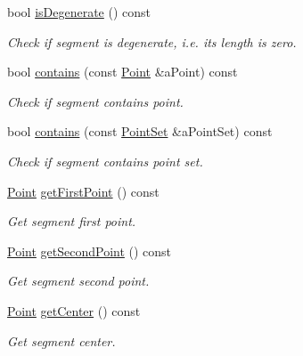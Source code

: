 \begin{DoxyCompactItemize}
bool \hyperlink{classostk_1_1math_1_1geom_1_1d2_1_1objects_1_1_segment_a35a46e06daf7d791b0069641cf684f91}{is\+Degenerate} () const
\begin{DoxyCompactList}\small\item\em Check if segment is degenerate, i.\+e. its length is zero. \end{DoxyCompactList}\item 
bool \hyperlink{classostk_1_1math_1_1geom_1_1d2_1_1objects_1_1_segment_a08468b912471a18d29062b96968afc2f}{contains} (const \hyperlink{classostk_1_1math_1_1geom_1_1d2_1_1objects_1_1_point}{Point} \&a\+Point) const
\begin{DoxyCompactList}\small\item\em Check if segment contains point. \end{DoxyCompactList}\item 
bool \hyperlink{classostk_1_1math_1_1geom_1_1d2_1_1objects_1_1_segment_afd9fea7d6b73c7136ddb1246e20134d3}{contains} (const \hyperlink{classostk_1_1math_1_1geom_1_1d2_1_1objects_1_1_point_set}{Point\+Set} \&a\+Point\+Set) const
\begin{DoxyCompactList}\small\item\em Check if segment contains point set. \end{DoxyCompactList}\item 
\hyperlink{classostk_1_1math_1_1geom_1_1d2_1_1objects_1_1_point}{Point} \hyperlink{classostk_1_1math_1_1geom_1_1d2_1_1objects_1_1_segment_a8c91be64413c5944403dcd61daa141ae}{get\+First\+Point} () const
\begin{DoxyCompactList}\small\item\em Get segment first point. \end{DoxyCompactList}\item 
\hyperlink{classostk_1_1math_1_1geom_1_1d2_1_1objects_1_1_point}{Point} \hyperlink{classostk_1_1math_1_1geom_1_1d2_1_1objects_1_1_segment_ac2ff9eb997a2cd304b9162dd800bce01}{get\+Second\+Point} () const
\begin{DoxyCompactList}\small\item\em Get segment second point. \end{DoxyCompactList}\item 
\hyperlink{classostk_1_1math_1_1geom_1_1d2_1_1objects_1_1_point}{Point} \hyperlink{classostk_1_1math_1_1geom_1_1d2_1_1objects_1_1_segment_a691c0ef8268b6c3628e1cb69beb9ed74}{get\+Center} () const
\begin{DoxyCompactList}\small\item\em Get segment center. \end{DoxyCompactList}\item 

\end{DoxyCompactItemize}
